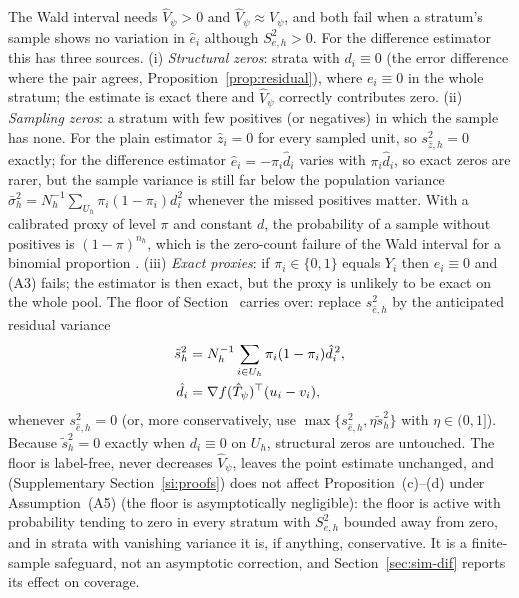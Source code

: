 \begin{remark}\label{rem:zero-var-ext}
The Wald interval needs $\hat V_\psi>0$ and $\hat V_\psi\approx V_\psi$, and both fail when a stratum's sample shows no variation in $\hat e_i$ although
$S^2_{e,h}>0$. For the difference estimator this has three sources. (i) \emph{Structural zeros}: strata with $d_i\equiv0$ (the error
difference where the pair agrees, Proposition~\ref{prop:residual}), where $e_i\equiv0$ in the whole stratum; the estimate is exact there and
$\hat V_\psi$ correctly contributes zero. (ii) \emph{Sampling zeros}: a stratum with few positives (or negatives) in which the sample has none. For the plain estimator $\hat z_i=0$ for every sampled unit, so $s^2_{\hat z,h}=0$ exactly;
for the difference estimator $\hat e_i=-\pi_i\hat d_i$ varies with $\pi_i\hat d_i$, so exact zeros are rarer, but the sample variance is still far below the
population variance $\bar\sigma^2_h=N_h^{-1}\sum_{U_h}\pi_i(1-\pi_i)d_i^2$ whenever the missed positives matter. With a calibrated proxy of level $\pi$ and constant $d$, the
probability of a sample without positives is $(1-\pi)^{n_h}$, which is the zero-count failure of the Wald interval for a binomial proportion \citep{brown2001}.
(iii) \emph{Exact proxies}: if $\pi_i\in\{0,1\}$ equals $Y_i$ then $e_i\equiv0$ and
(A3) fails; the estimator is then exact, but the proxy is unlikely to be exact on the whole pool. The floor of Section~ carries over: replace $s^2_{\hat e,h}$ by the anticipated
residual variance
\begin{align}
\tilde s^2_{h}&=N_h^{-1}\sum_{i\in U_h}\pi_i(1-\pi_i)\hat d_i^{\,2},\label{eq:floor}\\
\hat d_i&=\nabla f(\hat T_\psi)^\top(u_i-v_i),\notag
\end{align}
whenever $s^2_{\hat e,h}=0$ (or, more conservatively, use $\max\{s^2_{\hat e,h},\eta\tilde s^2_h\}$ with $\eta\in(0,1]$). Because $\tilde s^2_h=0$ exactly when $d_i\equiv0$ on $U_h$, structural zeros
are untouched. The floor is label-free, never decreases $\hat V_\psi$, leaves the point estimate unchanged, and (Supplementary Section~\ref{si:proofs}) does not affect
Proposition~(c)--(d) under Assumption~(A5) (the floor is asymptotically negligible): the floor is active with probability tending to zero in every stratum with $S^2_{e,h}$ bounded away from zero, and in strata
with vanishing variance it is, if anything, conservative. It is a finite-sample safeguard, not an asymptotic correction, and Section~\ref{sec:sim-dif} reports its effect on coverage.
\end{remark}

